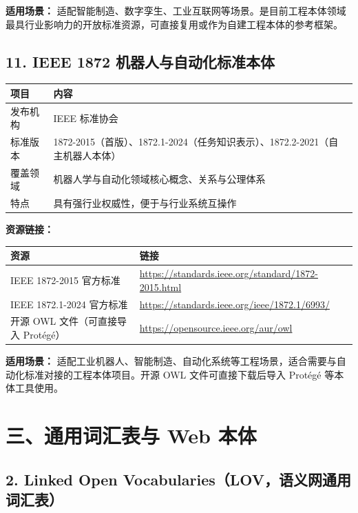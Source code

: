 \textbf{适用场景：} 适配智能制造、数字孪生、工业互联网等场景。是目前工程本体领域最具行业影响力的开放标准资源，可直接复用或作为自建工程本体的参考框架。


\subsection{11. IEEE 1872 机器人与自动化标准本体}

\begin{center}
\begin{tabularx}{\linewidth}{@{}lX@{}}
\toprule
\textbf{项目} & \textbf{内容} \\
\midrule
发布机构 & IEEE 标准协会 \\
标准版本 & 1872-2015（首版）、1872.1-2024（任务知识表示）、1872.2-2021（自主机器人本体） \\
覆盖领域 & 机器人学与自动化领域核心概念、关系与公理体系 \\
特点 & 具有强行业权威性，便于与行业系统互操作 \\
\bottomrule
\end{tabularx}
\end{center}
\color{black}

\textbf{资源链接：}

\begin{center}
\begin{tabularx}{\linewidth}{@{}XX@{}}
\toprule
\textbf{资源} & \textbf{链接} \\
\midrule
IEEE 1872-2015 官方标准 & \url{https://standards.ieee.org/standard/1872-2015.html} \\
IEEE 1872.1-2024 官方标准 & \url{https://standards.ieee.org/ieee/1872.1/6993/} \\
开源 OWL 文件（可直接导入 Protégé） & \url{https://opensource.ieee.org/aur/owl} \\
\bottomrule
\end{tabularx}
\end{center}
\color{black}

\textbf{适用场景：} 适配工业机器人、智能制造、自动化系统等工程场景，适合需要与自动化标准对接的工程本体项目。开源 OWL 文件可直接下载后导入 Protégé 等本体工具使用。


\section{三、通用词汇表与 Web 本体}

\subsection{2. Linked Open Vocabularies（LOV，语义网通用词汇表）}


